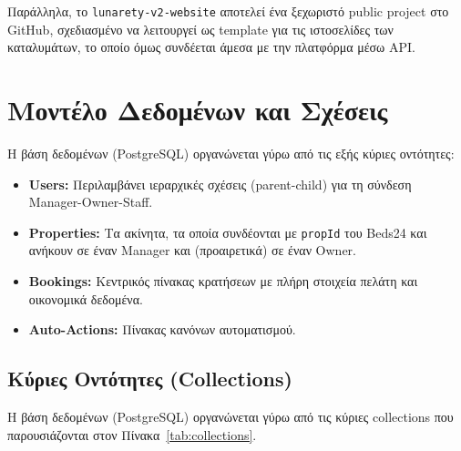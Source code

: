 \documentclass[
	12pt, %
	oneside, %
	greek,
	onehalfspacing, %
	liststotoc, %
	toctotoc, %
	parskip, %
	headsepline, %
]{MastersDoctoralThesis} %
\newcommand{\code}[1]{\texttt{#1}}
\begin{document}
Παράλληλα, το \code{lunarety-v2-website} αποτελεί ένα ξεχωριστό public project στο GitHub, σχεδιασμένο να λειτουργεί ως template για τις ιστοσελίδες των καταλυμάτων, το οποίο όμως συνδέεται άμεσα με την πλατφόρμα μέσω API.

\section{Μοντέλο Δεδομένων και Σχέσεις}
\label{sec:data-model}

Η βάση δεδομένων (PostgreSQL) οργανώνεται γύρω από τις εξής κύριες οντότητες:

\begin{itemize}
    \item \textbf{Users:} Περιλαμβάνει ιεραρχικές σχέσεις (parent-child) για τη σύνδεση Manager-Owner-Staff.
    \item \textbf{Properties:} Τα ακίνητα, τα οποία συνδέονται με \code{propId} του Beds24 και ανήκουν σε έναν Manager και (προαιρετικά) σε έναν Owner.
    \item \textbf{Bookings:} Κεντρικός πίνακας κρατήσεων με πλήρη στοιχεία πελάτη και οικονομικά δεδομένα.
    \item \textbf{Auto-Actions:} Πίνακας κανόνων αυτοματισμού.
\end{itemize}

\subsection{Κύριες Οντότητες (Collections)}
\label{subsec:collections}

Η βάση δεδομένων (PostgreSQL) οργανώνεται γύρω από τις κύριες collections που παρουσιάζονται στον Πίνακα~\ref{tab:collections}.
\end{document}
